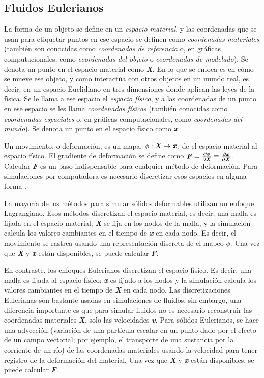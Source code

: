 \subsection{Fluidos Eulerianos}

La forma de un objeto se define en un \textit{espacio material}, y las coordenadas que se usan para etiquetar puntos en ese espacio se definen como \textit{coordenadas materiales} (también son conocidas como \textit{coordenadas de referencia} o, en gráficas computacionales, como \textit{coordenadas del objeto} o \textit{coordenadas de modelado}). Se denota un punto en el espacio material como \textbf{\textit{X}}. En lo que se enfoca es en cómo se mueve ese objeto, y como interactúa con otros objetos en un mundo real, es decir, en un espacio Euclidiano en tres dimensiones donde aplican las leyes de la física. Se le llama a ese espacio el \textit{espacio físico}, y a las coordenadas de un punto en ese espacio se les llama \textit{coordenadas físicas} (también conocidas como \textit{coordenadas espaciales} o, en gráficas computacionales, como \textit{coordenadas del mundo}). Se denota un punto en el espacio físico como \textbf{\textit{x}}.

Un movimiento, o deformación, es un mapa, $\phi : \textbf{\textit{X}} \to \textbf{\textit{x}}$, de el espacio material al espacio físico. El gradiente de deformación se define como $\textbf{\textit{F}} = \frac{\partial \phi}{\partial \textbf{\textit{X}}} \equiv \frac{\partial \textbf{\textit{x}}}{\partial \textbf{\textit{X}}}$. Calcular \textbf{\textit{F}} es un paso indispensable para cualquier método de deformación. Para simulaciones por computadora es necesario discretizar esos espacios en alguna forma \citep{pai2014eulerian}.

La mayoría de los métodos para simular sólidos deformables utilizan un enfoque Lagrangiano. Esos métodos discretizan el espacio material, es decir, una malla es fijada en el espacio material; \textbf{\textit{X}} se fija en los nodos de la malla, y la simulación calcula los valores cambiantes en el tiempo de \textbf{\textit{x}} en cada nodo. Es decir, el movimiento se rastrea usando una representación discreta de el mapeo $\phi$. Una vez que \textbf{\textit{X}} y \textbf{\textit{x}} están disponibles, se puede calcular \textbf{\textit{F}}.

En contraste, los enfoques Eulerianos discretizan el espacio físico. Es decir, una malla es fijada al espacio físico; \textbf{\textit{x}} es fijado a los nodos y la simulación calcula los valores cambiantes en el tiempo de \textbf{\textit{X}} en cada nodo. Las discretizaciones Eulerianas son bastante usadas en simulaciones de fluidos, sin embargo, una diferencia importante es que para simular fluidos no es necesario reconstruir las coordenadas materiales \textbf{\textit{X}}, solo las velocidades \textbf{\textit{v}}. Para sólidos Eulerianos, se hace una advección (variación de una partícula escalar en un punto dado por el efecto de un campo vectorial; por ejemplo, el transporte de una sustancia por la corriente de un río) de las coordenadas materiales usando la velocidad para tener registro de la deformación del material. Una vez que \textbf{\textit{X}} y \textbf{\textit{x}} están disponibles, se puede calcular \textbf{\textit{F}}.

